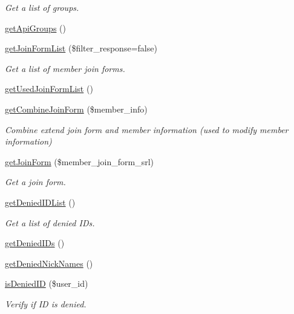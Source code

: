 \begin{DoxyCompactItemize}
\begin{DoxyCompactList}\small\item\em Get a list of groups. \end{DoxyCompactList}\item 
\hyperlink{classmemberModel_a7b52f35158a9d2dc8138359fcf120b88}{get\+Api\+Groups} ()
\item 
\hyperlink{classmemberModel_af8d32c782e4637661e9379acb8ee96b1}{get\+Join\+Form\+List} (\$filter\+\_\+response=false)
\begin{DoxyCompactList}\small\item\em Get a list of member join forms. \end{DoxyCompactList}\item 
\hyperlink{classmemberModel_ab249b6e54c0b7d472d3cd50ad3b658dc}{get\+Used\+Join\+Form\+List} ()
\item 
\hyperlink{classmemberModel_a0bb14a9030332a0ab996bf545ff77de6}{get\+Combine\+Join\+Form} (\$member\+\_\+info)
\begin{DoxyCompactList}\small\item\em Combine extend join form and member information (used to modify member information) \end{DoxyCompactList}\item 
\hyperlink{classmemberModel_ad4ecb6428f8ccea4369bb7535464570e}{get\+Join\+Form} (\$member\+\_\+join\+\_\+form\+\_\+srl)
\begin{DoxyCompactList}\small\item\em Get a join form. \end{DoxyCompactList}\item 
\hyperlink{classmemberModel_ad6bb73cc72412955c289f4f695b8d0c9}{get\+Denied\+I\+D\+List} ()
\begin{DoxyCompactList}\small\item\em Get a list of denied I\+Ds. \end{DoxyCompactList}\item 
\hyperlink{classmemberModel_af8bd4c178bbae831f02b5419bc0e02ea}{get\+Denied\+I\+Ds} ()
\item 
\hyperlink{classmemberModel_ac318ffed61009f4b2d993daee7788072}{get\+Denied\+Nick\+Names} ()
\item 
\hyperlink{classmemberModel_ac0ba5ea00ecf3113fe50947243a6be20}{is\+Denied\+I\+D} (\$user\+\_\+id)
\begin{DoxyCompactList}\small\item\em Verify if I\+D is denied. \end{DoxyCompactList}\item 

\end{DoxyCompactItemize}
